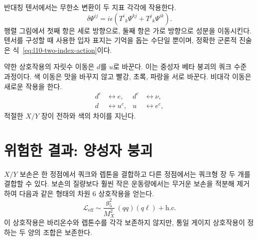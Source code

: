 반대칭 텐서에서는 무한소 변환이 두 지표 각각에 작용한다.
\begin{equation}
\delta\Psi^{ij}
=
i\epsilon
\left(
T^i{}_k\Psi^{kj}
+
T^j{}_k\Psi^{ik}
\right).
\label{eq:l10-two-index-action}
\end{equation}
행렬 그림에서 첫째 항은 세로 방향으로, 둘째 항은 가로 방향으로 성분을 이동시킨다. 텐서를 구성할 때 사용한 입자 표지는 기억을 돕는 수단일 뿐이며, 정확한 군론적 진술은 식~\eqref{eq:l10-two-index-action}이다.

약한 상호작용의 자릿수 이동은 \(d\)를 \(u\)로 바꾼다. 이는 중성자 베타 붕괴의 쿼크 수준 과정이다. 색 이동은 맛을 바꾸지 않고 빨강, 초록, 파랑을 서로 바꾼다. 비대각 이동은 새로운 작용을 한다.
\begin{equation}
\begin{aligned}
d^c&\longleftrightarrow e,
& d^c&\longleftrightarrow\nu,\\
d&\longleftrightarrow u^c,
& u&\longleftrightarrow e^c,
\end{aligned}
\label{eq:l10-leptoquark-shifts}
\end{equation}
적절한 \(X/Y\) 장이 전하와 색의 차이를 지닌다.

\begin{classroomqa}
\end{classroomqa}

\begin{classroomqa}
\end{classroomqa}

\section{위험한 결과: 양성자 붕괴}

\(X/Y\) 보손은 한 정점에서 쿼크와 렙톤을 결합하고 다른 정점에서는 쿼크형 장 두 개를 결합할 수 있다. 보손의 질량보다 훨씬 작은 운동량에서는 무거운 보손을 적분해 제거하여 다음과 같은 형태의 차원 6 상호작용을 얻는다.
\begin{equation}
\mathcal L_{\mathrm{eff}}
\sim
\frac{g_5^2}{M_X^2}\,(qq)(q\ell)
+\text{h.c.}
\label{eq:l10-effective-proton}
\end{equation}
이 상호작용은 바리온수와 렙톤수를 각각 보존하지 않지만, 통일 게이지 상호작용이 정하는 두 양의 조합은 보존한다.

